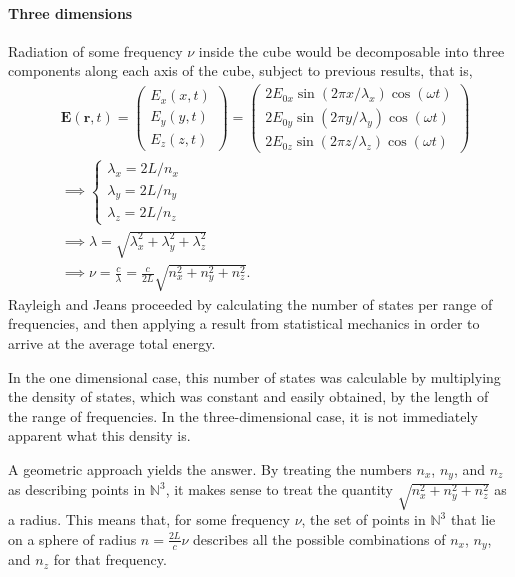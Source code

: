 \documentclass{article}
\begin{document}
\paragraph{Three dimensions}
Radiation of some frequency $\nu$ inside the cube would be decomposable into three components along each axis of the cube, subject to previous results, that is,
\begin{equation*}
    \begin{aligned}
            &\mathbf{E}(\mathbf{r},t) = \left( \begin{matrix}
        E_x(x,t) \\
        E_y(y,t) \\
        E_z(z,t)
    \end{matrix} \right) = \left( \begin{matrix}
        2E_{0x}\sin(2\pi x/\lambda_x)\cos(\omega t)\\
        2E_{0y}\sin(2\pi y/\lambda_y)\cos(\omega t)\\
        2E_{0z}\sin(2\pi z/\lambda_z)\cos(\omega t)
    \end{matrix} \right)\\
    &\implies\begin{cases}
        \lambda_x = 2L/n_x \\
        \lambda_y = 2L/n_y \\
        \lambda_z = 2L/n_z
    \end{cases}\\
    &\implies \lambda = \sqrt{\lambda_x^2 + \lambda_y^2 + \lambda_z^2}\\
    &\implies \nu = \frac{c}{\lambda} = \frac{c}{2L}\sqrt{n_x^2+n_y^2+n_z^2}.
    \end{aligned}
\end{equation*}
Rayleigh and Jeans proceeded by calculating the number of states per range of frequencies, and then applying a result from statistical mechanics in order to arrive at the average total energy. 

In the one dimensional case, this number of states was calculable by multiplying the density of states, which was constant and easily obtained, by the length of the range of frequencies. In the three-dimensional case, it is not immediately apparent what this density is.

A geometric approach yields the answer. By treating the numbers $n_x$, $n_y$, and $n_z$ as describing points in $\mathbb{N}^3$, it makes sense to treat the quantity $\sqrt{n_x^2+n_y^2+n_z^2}$ as a radius. This means that, for some frequency $\nu$, the set of points in $\mathbb{N}^3$ that lie on a sphere of radius $n = \frac{2L}{c}\nu$ describes all the possible combinations of $n_x$, $n_y$, and $n_z$ for that frequency.
\end{document}
